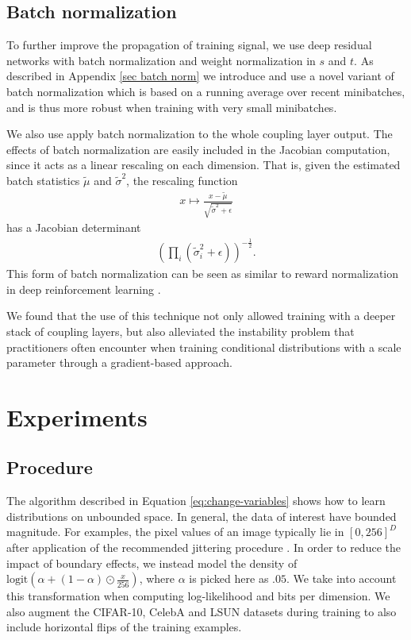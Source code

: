 \documentclass{article}
\begin{document}
\subsection{Batch normalization}
To further improve the propagation of training signal, we use deep residual networks \citep{DBLP:journals/corr/HeZRS15, DBLP:journals/corr/HeZR016} with batch normalization \citep{ioffe2015batch} and weight normalization \citep{badrinarayanan2015understanding, salimans2016weight} in $s$ and $t$.
As described in Appendix \ref{sec batch norm} we introduce and use a novel variant of batch normalization which is based on a running average over recent minibatches, and is thus more robust when training with very small minibatches.

We also use apply batch normalization to the whole coupling layer output.
The effects of batch normalization are easily included in the Jacobian computation, since it acts as a linear rescaling on each dimension. That is, given the estimated batch statistics $\tilde{\mu}$ and $\tilde{\sigma}^{2}$, the rescaling function
\begin{align}
x \mapsto \frac{x - \tilde{\mu}}{\sqrt{\tilde{\sigma}^{2} + \epsilon}}
\end{align}
has a Jacobian determinant
\begin{align}
\left(\prod_{i}{(\tilde{\sigma}_{i}^{2} + \epsilon)}\right)^{-\frac{1}{2}}.
\end{align}
This form of batch normalization can be seen as similar to reward normalization in deep reinforcement learning \citep{mnih2015human, van2016learning}.

We found that the use of this technique not only allowed training with a deeper stack of coupling layers, but also alleviated the instability problem that practitioners often encounter when training conditional distributions with a scale parameter through a gradient-based approach.


\section{Experiments}
\subsection{Procedure}
The algorithm described in Equation \ref{eq:change-variables} shows how to learn distributions on unbounded space. In general, the data of interest have bounded magnitude. For examples, the pixel values of an image typically lie in $[0, 256]^{D}$ after application of the recommended jittering procedure \citep{uria2013rnade, DBLP:journals/corr/TheisOB15}. In order to reduce the impact of boundary effects, we instead model the density of $\mbox{logit}(\alpha + (1 - \alpha) \odot \frac{x}{256})$, where $\alpha$ is picked here as $.05$.
We take into account this transformation when computing log-likelihood and bits per dimension. We also augment the CIFAR-10, CelebA and LSUN datasets during training to also include horizontal flips of the training examples. 
\end{document}
